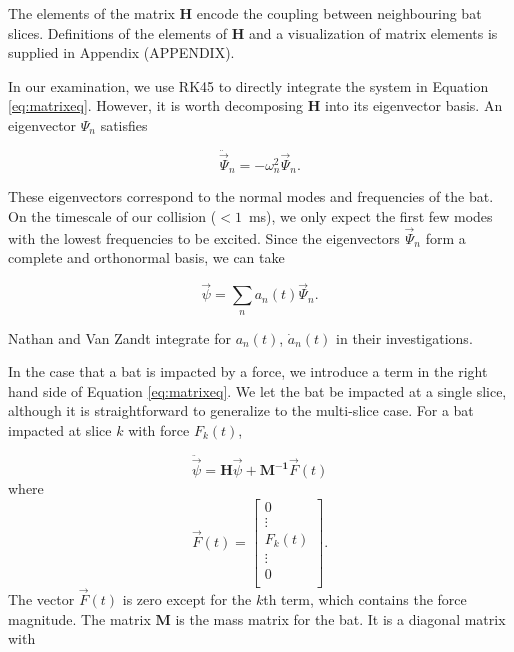 \documentclass[linenumbers]{aastex7}
\begin{document}
The elements of the matrix $\mathbf{H}$ encode the coupling between neighbouring
bat slices. Definitions of the elements of $\mathbf{H}$ and a visualization of
matrix elements is supplied in Appendix (APPENDIX).


In our examination, we use RK45 to directly integrate the system in Equation \ref{eq:matrixeq}. However, it is worth decomposing $\mathbf{H}$ into its eigenvector basis. An eigenvector $\Psi_n$ satisfies

\begin{equation}\label{eq:eigveceq}
	\ddot{\vec{\Psi}}_n = - \omega^2_n\vec{\Psi}_n.
\end{equation}

These eigenvectors correspond to the normal modes and frequencies of the bat. On the timescale of our collision ($<1$~ms), we only expect the first few modes with the lowest frequencies to be excited. Since the eigenvectors ${\vec{\Psi}_n}$ form a complete and orthonormal basis, we can take

\begin{equation}
	\vec{\psi} = \sum_n a_n(t)\vec{\Psi}_n.
\end{equation}

Nathan and Van Zandt integrate for $a_n(t)$, $\dot{a}_n(t)$ in their investigations.

In the case that a bat is impacted by a force, we introduce a term in the right hand side of Equation \ref{eq:matrixeq}. We let the bat be impacted at a single slice, although it is straightforward to generalize to the multi-slice case. For a bat impacted at slice $k$ with force $F_k(t)$,

\begin{equation}\label{eq:batforce}
	\ddot{\vec{\psi}} = \mathbf{H} \vec{\psi} + \mathbf{M^{-1}}\vec{F}(t)
\end{equation}
where
\begin{equation}
	\vec{F}(t) = \begin{bmatrix}
		0 \\ \vdots \\ F_k(t) \\ \vdots\\ 0 \\
	\end{bmatrix}.
\end{equation}
The vector $\vec{F}(t)$ is zero except for the $k$th term, which contains the force magnitude. The matrix $\mathbf{M}$ is the mass matrix for the bat. It is a diagonal matrix with
\end{document}
